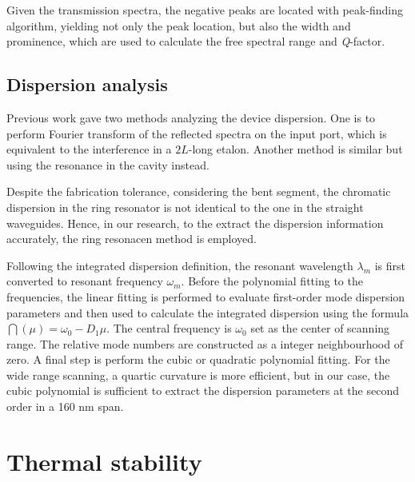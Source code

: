 Given the transmission spectra, the negative peaks are located with peak-finding algorithm, yielding not only the peak location, but also the width and prominence, which are used to calculate the free spectral range and \textit{Q}-factor.

\subsection{Dispersion analysis}
Previous work \cite{Sunada2018} gave two methods analyzing the device dispersion. One is to perform Fourier transform of the reflected spectra on the input port, which is equivalent to the interference in a $2L$-long etalon. Another method is similar but using the resonance in the cavity instead. 

Despite the fabrication tolerance, considering the bent segment, the chromatic dispersion in the ring resonator is not identical to the one in the straight waveguides. Hence, in our research, to the extract the dispersion information accurately, the ring resonacen method is employed. 

Following the integrated dispersion definition, the resonant wavelength $\lambda_m$ is first converted to resonant frequency $\omega_m$. Before the polynomial fitting to the frequencies, the linear fitting is performed to evaluate first-order mode dispersion parameters and then used to calculate the integrated dispersion using the formula $ \dint(\mu) = \omega_0 - D_1 \mu$. The central frequency is $\omega_0$ set as the center of scanning range. The relative mode numbers are constructed as a integer neighbourhood of zero. A final step is perform the cubic or quadratic polynomial fitting. For the wide range scanning, a quartic curvature is more efficient, but in our case, the cubic polynomial is sufficient to extract the dispersion parameters at the second order in a 160 nm span.

\section{Thermal stability}

\begin{figure}
	\centering
	
	\label{fig:thermal}
\end{figure}

